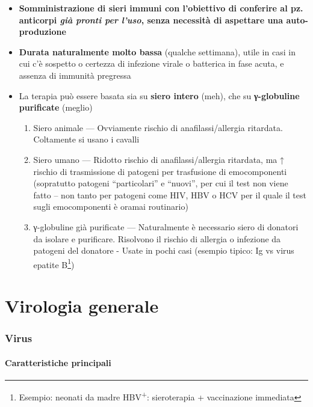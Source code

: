 \documentclass[italian,]{article}
\providecommand{\tightlist}{%
  \setlength{\itemsep}{0pt}\setlength{\parskip}{0pt}}
\begin{document}
\begin{itemize}
\tightlist
\item
  \textbf{Somministrazione di sieri immuni con l'obiettivo di conferire
  al pz. anticorpi \emph{già pronti per l'uso}, senza necessità di
  aspettare una auto-produzione}
\item
  \textbf{Durata naturalmente molto bassa} (qualche settimana), utile in
  casi in cui c'è sospetto o certezza di infezione virale o batterica in
  fase acuta, e assenza di immunità pregressa
\item
  La terapia può essere basata sia su \textbf{siero intero} (meh), che
  su \textbf{γ-globuline purificate} (meglio)

  \begin{enumerate}
  \def\labelenumi{\arabic{enumi}.}
  \tightlist
  \item
    Siero animale --- Ovviamente rischio di anafilassi/allergia
    ritardata. Coltamente si usano i cavalli
  \item
    Siero umano --- Ridotto rischio di anafilassi/allergia ritardata, ma
    ↑ rischio di trasmissione di patogeni per trasfusione di
    emocomponenti (sopratutto patogeni ``particolari'' e ``nuovi'', per
    cui il test non viene fatto -- non tanto per patogeni come HIV, HBV
    o HCV per il quale il test sugli emocomponenti è oramai routinario)
  \item
    γ-globuline già purificate --- Naturalmente è necessario siero di
    donatori da isolare e purificare. Risolvono il rischio di allergia o
    infezione da patogeni del donatore - Usate in pochi casi (esempio
    tipico: Ig vs virus epatite B\footnote{Esempio: neonati da madre
      HBV\textsuperscript{+}: sieroterapia + vaccinazione immediata})
  \end{enumerate}
\end{itemize}

\clearpage

\part{Virologia generale}

\hypertarget{virus}{%
\section{Virus}\label{virus}}

\hypertarget{caratteristiche-principali}{%
\subsection{Caratteristiche
principali}\label{caratteristiche-principali}}
\end{document}
